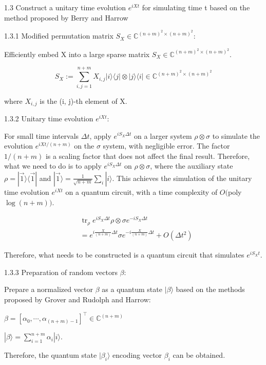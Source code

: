 \documentclass[12pt]{article}
\begin{document}
1.3 Construct a unitary time evolution $e^{i X t}$ for simulating time t based on the method proposed by Berry \cite{berry2007efficient} and Harrow \cite{harrow2009quantum}

1.3.1 Modified permutation matrix $S_{X} \in \mathbb{C}^{(n+m)^{2} \times(n+m)^{2}}$:

Efficiently embed X into a large sparse matrix $S_{X} \in \mathbb{C}^{(n+m)^{2} \times(n+m)^{2}}$.

$$
S_{X}:=\sum_{i, j=1}^{n+m} X_{i, j}|i\rangle\langle j|\otimes| j\rangle\langle i| \in \mathbb{C}^{(n+m)^{2} \times(n+m)^{2}}
$$

where $X_{i, j}$ is the (i, j)-th element of X.

1.3.2 Unitary time evolution $e^{i X t}$:

For small time intervals $\Delta t$, apply $e^{i S_{X} \Delta t}$ on a larger system $\rho \otimes \sigma$ to simulate the evolution $e^{i X t /(n+m)}$ on the $\sigma$ system, with negligible error. The factor $1 /(n+m)$ is a scaling factor that does not affect the final result. Therefore, what we need to do is to apply $e^{i S_{X} \Delta t}$ on $\rho \otimes \sigma$, where the auxiliary state $\rho=|\overrightarrow{1}\rangle\langle\overrightarrow{1}|$ and $|\overrightarrow{1}\rangle=\frac{1}{\sqrt{n+m}} \sum_{i}|i\rangle$. This achieves the simulation of the unitary time evolution $e^{i X t}$ on a quantum circuit, with a time complexity of $O($poly $\log (n+m))$.

$$
\begin{aligned}
& \operatorname{tr}_{\rho} e^{i S_{X} \Delta t} \rho \otimes \sigma e^{-i S_{X} \Delta t} \\
& =e^{i \frac{X}{(n+m)} \Delta t} \sigma e^{-i \frac{X}{(n+m)} \Delta t}+O\left(\Delta t^{2}\right)
\end{aligned}
$$

Therefore, what needs to be constructed is a quantum circuit that simulates $e^{i S_{X} t}$.

1.3.3 Preparation of random vectors $\beta$:

Prepare a normalized vector $\beta$ as a quantum state $|\beta\rangle$ based on the methods proposed by Grover and Rudolph \cite{grover2002creating} and Harrow\cite{lloyd2014quantum}:

$\beta=\left[\alpha_{0}, \cdots, \alpha_{(n+m)-1}\right]^{\top} \in \mathbb{C}^{(n+m)}$

$|\beta\rangle=\sum_{i=1}^{n+m} \alpha_{i}|i\rangle$.

Therefore, the quantum state $|\beta_{i}\rangle$ encoding vector $\beta_{i}$ can be obtained.
\end{document}
